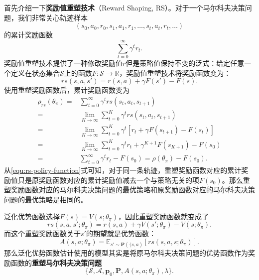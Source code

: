 首先介绍一下\textbf{奖励值重塑技术}（Reward Shaping, RS）\cite{ng1999policy}。对于一个马尔科夫决策问题，我们非常关心轨迹样本
\begin{equation}
    (s_0, a_0, r_0, s_1, a_1, r_1, \ldots, s_t, a_t, r_t, \ldots)  
\end{equation}
的累计奖励函数
\begin{equation}
    \sum^{\infty}_{t=0} \gamma^t r_t.
\end{equation}
奖励值重塑技术提供了一种修改奖励值$r$但是策略值保持不变的泛式：给定任意一个定义在状态集合$\mathcal{S}$上的函数$F: \mathcal{S} \rightarrow \mathbb{R}$，奖励值重塑技术将奖励函数变为：
\begin{equation}
    rs(s, a, s') = r(s, a) + \gamma F(s') - F(s).
\end{equation}
使用重塑奖励函数后，累计奖励函数变为
\begin{equation}\label{equ:rs-policy-function}
    \begin{aligned}
        \rho_{rs}(\theta_\pi) 
        =&\sum^{\infty}_{t=0} \gamma^t rs(s_t, a_t, s_{t+1})\\
        =& \lim_{K \rightarrow \infty}
            \sum^{K}_{t=0} \gamma^t rs(s_t, a_t, s_{t+1})\\
        =& \lim_{K \rightarrow \infty}
            \sum^{K}_{t=0} \gamma^t [r_t + \gamma F(s_{t+1}) - F(s_t)]\\
        =& \lim_{K \rightarrow \infty}
            \sum^{K}_{t=0} \gamma^t r_t + \gamma^{K+1} F(s_{K+1}) - F(s_0)\\
        =&\sum^{\infty}_{t=0} \gamma^t r_t - F(s_0) = \rho(\theta_\pi) - F(s_0).
    \end{aligned}
\end{equation}
从\eqref{equ:rs-policy-function}式可知，对于同一条轨迹，重塑奖励函数对应的累计奖励值只是原奖励函数对应的累计奖励值减去一个与策略无关的项$F(s_0)$。那么重塑奖励函数对应的马尔科夫决策问题的最优策略和原奖励函数对应的马尔科夫决策问题的最优策略是相同的。

泛化优势函数选择$F(s) = V(s; \theta_\pi)$，因此重塑奖励函数就变成了
\begin{equation}
 rs(s, a, s'; \theta_\pi) = r(s, a) + \gamma V(s'; \theta_\pi) - V(s; \theta_\pi).
\end{equation}
而这个重塑奖励函数关于$s'$的期望就是优势函数：
\begin{equation}
    A(s, a; \theta_\pi) = \mathbb{E}_{s' \sim \mathbf{P}(\cdot \vert s, a)}
    [rs(s, a, s; \theta_\pi)].
\end{equation}
那么泛化优势函数估计使用的模型其实是将原马尔科夫决策问题的优势函数作为奖励函数的\textbf{重塑马尔科夫决策问题}
\begin{equation}
    \{\mathcal{S}, \mathcal{A}, \mathbf{p}_0, \mathbf{P}, A(s, a;\theta_\pi), \lambda\}.
\end{equation}

